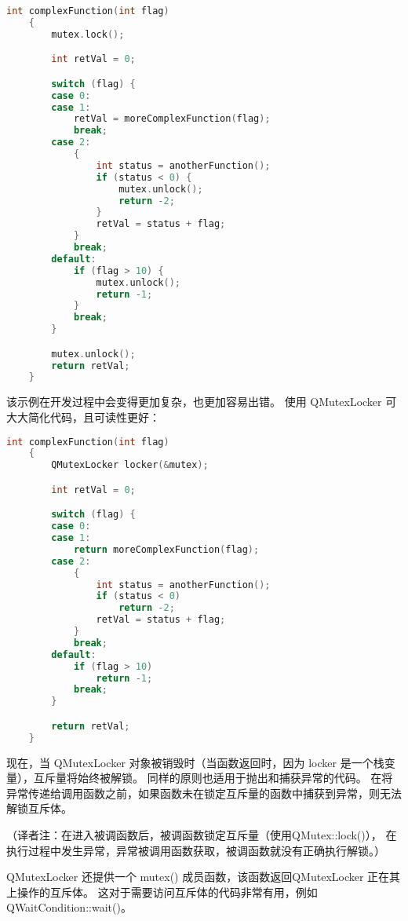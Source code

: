 \begin{lstlisting}[language=C++]
    int complexFunction(int flag)
    {
        mutex.lock();

        int retVal = 0;

        switch (flag) {
        case 0:
        case 1:
            retVal = moreComplexFunction(flag);
            break;
        case 2:
            {
                int status = anotherFunction();
                if (status < 0) {
                    mutex.unlock();
                    return -2;
                }
                retVal = status + flag;
            }
            break;
        default:
            if (flag > 10) {
                mutex.unlock();
                return -1;
            }
            break;
        }

        mutex.unlock();
        return retVal;
    }
\end{lstlisting}

该示例在开发过程中会变得更加复杂，也更加容易出错。 
使用 QMutexLocker 可大大简化代码，且可读性更好：

\begin{lstlisting}[language=C++]
    int complexFunction(int flag)
    {
        QMutexLocker locker(&mutex);

        int retVal = 0;

        switch (flag) {
        case 0:
        case 1:
            return moreComplexFunction(flag);
        case 2:
            {
                int status = anotherFunction();
                if (status < 0)
                    return -2;
                retVal = status + flag;
            }
            break;
        default:
            if (flag > 10)
                return -1;
            break;
        }

        return retVal;
    }
\end{lstlisting}

现在，当 QMutexLocker 对象被销毁时（当函数返回时，因为 locker 是一个栈变量），互斥量将始终被解锁。
同样的原则也适用于抛出和捕获异常的代码。
在将异常传递给调用函数之前，如果函数未在锁定互斥量的函数中捕获到异常，则无法解锁互斥体。

（译者注：在进入被调函数后，被调函数锁定互斥量（使用QMutex::lock()），
在执行过程中发生异常，异常被调用函数获取，被调函数就没有正确执行解锁。）

QMutexLocker 还提供一个 mutex() 成员函数，该函数返回QMutexLocker 正在其上操作的互斥体。
这对于需要访问互斥体的代码非常有用，例如 QWaitCondition::wait()。

